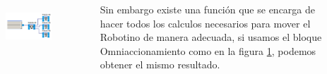 \begin{frame}
	\begin{columns}
		\begin{figure}
			\begin{center}
				\includegraphics[width=0.9\textwidth]{images/03-movimiento/04.png}
				\label{fig:movimiento-04}
			\end{center}
		\end{figure}

		Sin embargo existe una función que se encarga de hacer todos los calculos necesarios para mover el Robotino de manera adecuada, si usamos el bloque Omniaccionamiento como en la figura \ref{fig:movimiento-04}, podemos obtener el mismo resultado.
	\end{columns}
\end{frame}

